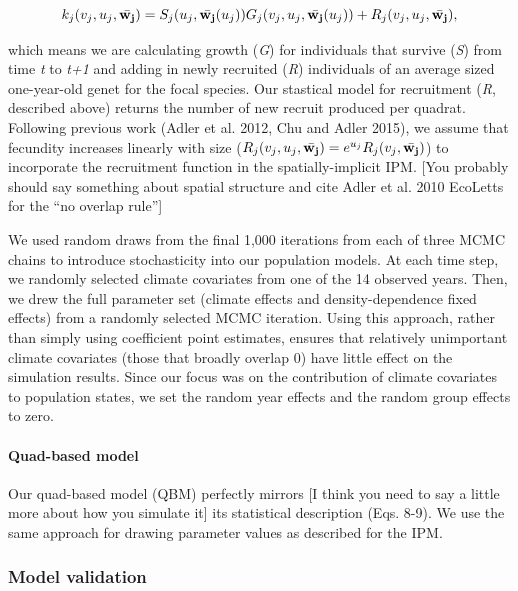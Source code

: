 \documentclass[12pt,]{article}
\begin{document}
\begin{equation}
k_{j}(v_{j},u_{j},\bar{\bold{w_{j}}}) = S_j(u_j, \bar{\bold{w_{j}}}(u_{j}))G_j(v_{j},u_{j},\bar{\bold{w_{j}}}(u_{j})) + R_j(v_{j},u_{j},\bar{\bold{w_{j}}}),
\end{equation}

which means we are calculating growth (\emph{G}) for individuals that
survive (\emph{S}) from time \emph{t} to \emph{t+1} and adding in newly
recruited (\emph{R}) individuals of an average sized one-year-old genet
for the focal species. Our stastical model for recruitment (\emph{R},
described above) returns the number of new recruit produced per quadrat.
Following previous work (Adler et al. 2012, Chu and Adler 2015), we
assume that fecundity increases linearly with size
($R_j(v_{j},u_{j},\bar{\bold{w_{j}}}) = e^{u_j}R_j(v_{j},\bar{\bold{w_{j}}})$)
to incorporate the recruitment function in the spatially-implicit IPM.
{[}You probably should say something about spatial structure and cite
Adler et al. 2010 EcoLetts for the ``no overlap rule''{]}

We used random draws from the final 1,000 iterations from each of three
MCMC chains to introduce stochasticity into our population models. At
each time step, we randomly selected climate covariates from one of the
14 observed years. Then, we drew the full parameter set (climate effects
and density-dependence fixed effects) from a randomly selected MCMC
iteration. Using this approach, rather than simply using coefficient
point estimates, ensures that relatively unimportant climate covariates
(those that broadly overlap 0) have little effect on the simulation
results. Since our focus was on the contribution of climate covariates
to population states, we set the random year effects and the random
group effects to zero.

\paragraph{Quad-based model}\label{quad-based-model}

Our quad-based model (QBM) perfectly mirrors {[}I think you need to say
a little more about how you simulate it{]} its statistical description
(Eqs. 8-9). We use the same approach for drawing parameter values as
described for the IPM.

\subsubsection{Model validation}\label{model-validation}
\end{document}

